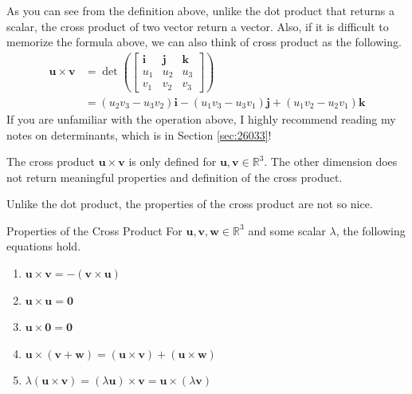 \documentclass[../../../main.tex]{subfiles}
\begin{document}
As you can see from the definition above, unlike the dot product
that returns a scalar, the cross product of two vector return
a vector. Also, if it is difficult to memorize the formula above,
we can also think of cross product as the following.
\begin{align*}
    \mathbf{u} \times \mathbf{v}
    &= \det\left(
        \begin{bmatrix}
            \mathbf{i} & \mathbf{j} & \mathbf{k} \\
            u_1        & u_2        & u_3        \\
            v_1        & v_2        & v_3
        \end{bmatrix}
    \right) \\
    &= (u_2v_3 - u_3v_2) \mathbf{i} - (u_1v_3 - u_3v_1) \mathbf{j}
        + (u_1v_2 - u_2v_1) \mathbf{k}
\end{align*}
If you are unfamiliar with the operation above, I highly recommend
reading my notes on determinants, which is in Section \ref{sec:26033}!

\begin{important}
The cross product $\mathbf{u} \times \mathbf{v}$ is only defined for
$\mathbf{u}, \mathbf{v} \in \mathbb{R}^3$. The other dimension does
not return meaningful properties and definition of the cross product.
\end{important}

Unlike the dot product, the properties of the cross product are
not so nice.

\begin{theorem}{}{Properties of the Cross Product}
For $\mathbf{u}, \mathbf{v}, \mathbf{w} \in \mathbb{R}^3$ and some
scalar $\lambda$, the following equations hold.
\vspace{-0.8\baselineskip}
\begin{enumerate}
\item
$\mathbf{u} \times \mathbf{v} = - (\mathbf{v} \times \mathbf{u})$
\item
$\mathbf{u} \times \mathbf{u} = \mathbf{0}$
\item
$\mathbf{u} \times \mathbf{0} = \mathbf{0}$
\item
$\mathbf{u} \times (\mathbf{v} + \mathbf{w})
= (\mathbf{u} \times \mathbf{v}) + (\mathbf{u} \times \mathbf{w})$
\item
$\lambda (\mathbf{u} \times \mathbf{v})
= (\lambda \mathbf{u}) \times \mathbf{v}
= \mathbf{u} \times (\lambda \mathbf{v})$
\end{enumerate}
\end{theorem}
\end{document}
